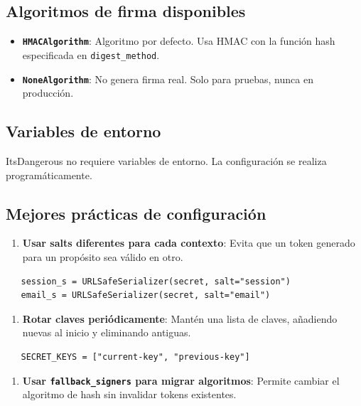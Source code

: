\documentclass[11pt,a4paper]{article}
\begin{document}
\subsection*{Algoritmos de firma disponibles}


\begin{itemize}[leftmargin=*,topsep=2pt,itemsep=1pt]
  \item \textbf{\texttt{HMACAlgorithm}}: Algoritmo por defecto. Usa HMAC con la función hash especificada en \texttt{digest\_method}.
  \item \textbf{\texttt{NoneAlgorithm}}: No genera firma real. Solo para pruebas, nunca en producción.
\end{itemize}


\subsection*{Variables de entorno}


ItsDangerous no requiere variables de entorno. La configuración se realiza programáticamente.


\subsection*{Mejores prácticas de configuración}


\begin{enumerate}[leftmargin=*,topsep=2pt,itemsep=1pt]
  \item \textbf{Usar salts diferentes para cada contexto}: Evita que un token generado para un propósito sea válido en otro.
\end{enumerate}


\begin{lstlisting}
   session_s = URLSafeSerializer(secret, salt="session")
   email_s = URLSafeSerializer(secret, salt="email")
\end{lstlisting}


\begin{enumerate}[leftmargin=*,topsep=2pt,itemsep=1pt]
  \item \textbf{Rotar claves periódicamente}: Mantén una lista de claves, añadiendo nuevas al inicio y eliminando antiguas.
\end{enumerate}


\begin{lstlisting}
   SECRET_KEYS = ["current-key", "previous-key"]
\end{lstlisting}


\begin{enumerate}[leftmargin=*,topsep=2pt,itemsep=1pt]
  \item \textbf{Usar \texttt{fallback\_signers} para migrar algoritmos}: Permite cambiar el algoritmo de hash sin invalidar tokens existentes.
\end{enumerate}
\end{document}
